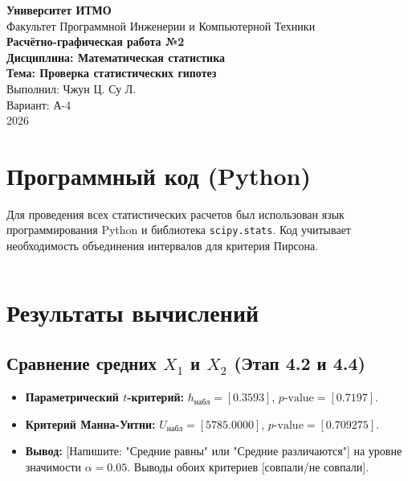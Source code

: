 \documentclass[a4paper,12pt]{article}
\begin{document}
\begin{titlepage}
    \centering
    \textbf{Университет ИТМО} \\
    \vspace{1em}
    Факультет Программной Инженерии и Компьютерной Техники\\
    \vspace{1em}
    \vspace{4cm}
    \textbf{\Large Расчётно-графическая работа №2} \\
    \textbf{Дисциплина: Математическая статистика} \\
    \vspace{4cm}
    \textbf{Тема: Проверка статистических гипотез} \\
    \vfill
    Выполнил: Чжун Ц.
              Су Л.\\
    Вариант: А-4 \\
    2026
\end{titlepage}

\section{Программный код (Python)}
Для проведения всех статистических расчетов был использован язык программирования Python и библиотека \texttt{scipy.stats}. Код учитывает необходимость объединения интервалов для критерия Пирсона.

\begin{lstlisting}[caption=Реализация статистических критериев]

\end{lstlisting}

\section{Результаты вычислений}

\subsection{Сравнение средних $X_1$ и $X_2$ (Этап 4.2 и 4.4)}
\begin{itemize}
    \item \textbf{Параметрический $t$-критерий:} $h_{набл} = [0.3593]$, $p\text{-value} = [0.7197]$.
    \item \textbf{Критерий Манна-Уитни:} $U_{набл} = [5785.0000]$, $p\text{-value} = [0.709275]$.
    \item \textbf{Вывод:} [Напишите: "Средние равны" или "Средние различаются"] на уровне значимости $\alpha=0.05$. Выводы обоих критериев [совпали/не совпали].
\end{itemize}
\end{document}
